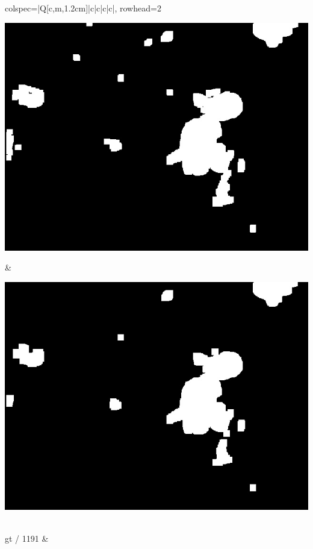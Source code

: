 \begin{longtblr}[
            caption = {Hasil uji coba proses \textit{background subtraction} menggunakan GMM yang disempurnakan oleh Operasi Morfologi},
            label = {tab:gmm_morph_9908}
        ]{
            colspec={|Q[c,m,1.2cm]|c|c|c|c|},
            rowhead=2
        }
\begin{minipage}{0.19\textwidth}
                \includegraphics[width=\linewidth]{image/gt_124/gt_124_dilated_5x11_frame1173.jpg}
            \end{minipage} & 
            \begin{minipage}{0.19\textwidth}
                \includegraphics[width=\linewidth]{image/gt_124/gt_124_dilated_7x13_frame1173.jpg}
            \end{minipage} \\
            \hline
            gt / 1191 &
            \begin{minipage}{0.19\textwidth}

\end{minipage}
\end{longtblr}
